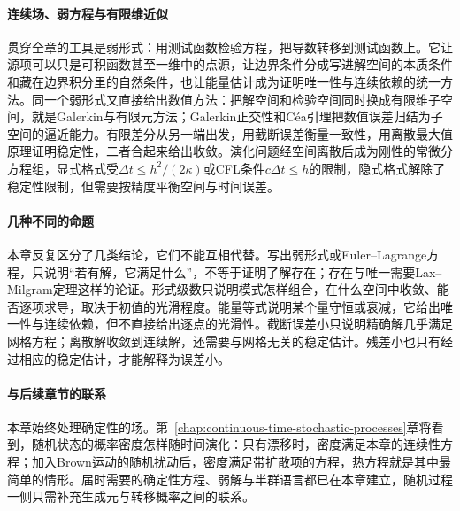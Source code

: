 \paragraph{连续场、弱方程与有限维近似}
贯穿全章的工具是弱形式：用测试函数检验方程，把导数转移到测试函数上。它让源项可以只是可积函数甚至一维中的点源，让边界条件分成写进解空间的本质条件和藏在边界积分里的自然条件，也让能量估计成为证明唯一性与连续依赖的统一方法。同一个弱形式又直接给出数值方法：把解空间和检验空间同时换成有限维子空间，就是Galerkin与有限元方法；Galerkin正交性和Céa引理把数值误差归结为子空间的逼近能力。有限差分从另一端出发，用截断误差衡量一致性，用离散最大值原理证明稳定性，二者合起来给出收敛。演化问题经空间离散后成为刚性的常微分方程组，显式格式受$\Delta t\leq h^2/(2\kappa)$或CFL条件$c\Delta t\leq h$的限制，隐式格式解除了稳定性限制，但需要按精度平衡空间与时间误差。

\paragraph{几种不同的命题}
本章反复区分了几类结论，它们不能互相代替。写出弱形式或Euler--Lagrange方程，只说明“若有解，它满足什么”，不等于证明了解存在；存在与唯一需要Lax--Milgram定理这样的论证。形式级数只说明模式怎样组合，在什么空间中收敛、能否逐项求导，取决于初值的光滑程度。能量等式说明某个量守恒或衰减，它给出唯一性与连续依赖，但不直接给出逐点的光滑性。截断误差小只说明精确解几乎满足网格方程；离散解收敛到连续解，还需要与网格无关的稳定估计。残差小也只有经过相应的稳定估计，才能解释为误差小。

\paragraph{与后续章节的联系}
本章始终处理确定性的场。第~\ref{chap:continuous-time-stochastic-processes}章将看到，随机状态的概率密度怎样随时间演化：只有漂移时，密度满足本章的连续性方程；加入Brown运动的随机扰动后，密度满足带扩散项的方程，热方程就是其中最简单的情形。届时需要的确定性方程、弱解与半群语言都已在本章建立，随机过程一侧只需补充生成元与转移概率之间的联系。
